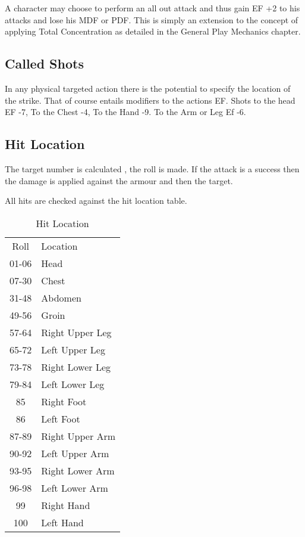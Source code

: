 A character may choose to perform an all out attack and thus gain 
EF +2 to his attacks and lose his MDF or PDF. This is simply an
extension to the concept of applying Total Concentration as detailed 
in the General Play Mechanics chapter.

\subsection{Called Shots}
 
In any physical targeted action there is the potential to specify the 
location of the strike. That of course entails modifiers to the 
actions EF. Shots to the head EF -7, To the Chest -4, To the Hand -9.
To the Arm or Leg Ef -6.

\subsection{Hit Location}

The target number is calculated , the roll is made. If  the attack
is a success then the damage is applied against the armour and then
the target.

All hits are checked against the hit location table.

\begin{table}[hb]
\centering
\caption{Hit Location}
	\begin{tabular}{||c|l||} \hline
	Roll          &  Location \\
	01-06         &  Head \\
	07-30         &  Chest \\
	31-48         &  Abdomen \\
	49-56         &  Groin \\
	57-64         &  Right   Upper Leg \\
	65-72         &  Left    Upper Leg \\
	73-78         &  Right   Lower Leg \\
	79-84         &  Left    Lower Leg \\
	 85           &  Right   Foot \\
	 86           &  Left    Foot \\
	87-89         &  Right   Upper Arm \\
	90-92         &  Left    Upper Arm \\
	93-95         &  Right   Lower Arm \\
	96-98         &  Left    Lower Arm \\
	 99           &  Right   Hand \\
	 100          &  Left    Hand \\     \hline
	\end{tabular}
\end{table}

